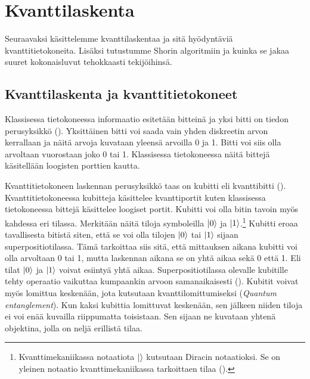 \chapter{Kvanttilaskenta}
Seuraavaksi käsittelemme kvanttilaskentaa ja sitä hyödyntäviä kvanttitietokoneita. Lisäksi tutustumme Shorin algoritmiin ja kuinka se jakaa suuret kokonaisluvut tehokkaasti tekijöihinsä.

\section{Kvanttilaskenta ja kvanttitietokoneet}
Klassisessa tietokoneessa informaatio esitetään bitteinä ja yksi bitti on tiedon perusyksikkö (\cite{doi:10.1080/23742917.2016.1226650}). Yksittäinen bitti voi saada vain yhden diskreetin arvon kerrallaan ja näitä arvoja kuvataan yleensä arvoilla 0 ja 1. Bitti voi siis olla arvoltaan vuorostaan joko 0 tai 1. Klassisessa tietokoneessa näitä bittejä käsitellään loogisten porttien kautta.

Kvanttitietokoneen laskennan perusyksikkö taas on kubitti eli kvanttibitti (\cite{doi:10.1080/23742917.2016.1226650}). Kvanttitietokoneessa kubitteja käsittelee kvanttiportit kuten klassisessa tietokoneessa bittejä käsittelee loogiset portit. Kubitti voi olla bitin tavoin myös kahdessa eri tilassa. Merkitään näitä tiloja symboleilla
$\ket{0}$ ja $\ket{1}$.\footnote{Kvanttimekaniikassa notaatiota $\ket{}$ kutsutaan Diracin notaatioksi. Se on yleinen notaatio kvanttimekaniikassa tarkoittaen tilaa (\cite{nielsen2001quantum}).} Kubitti eroaa tavallisesta bitistä siten, että se voi olla tilojen $\ket{0}$ tai $\ket{1}$ sijaan superpositiotilassa. Tämä tarkoittaa siis sitä, että mittauksen aikana kubitti voi olla arvoltaan 0 tai 1, mutta laskennan aikana se on yhtä aikaa sekä 0 että 1. Eli tilat $\ket{0}$ ja $\ket{1}$ voivat esiintyä yhtä aikaa. Superpositiotilassa olevalle kubitille tehty operaatio vaikuttaa kumpaankin arvoon samanaikaisesti (\cite{mavroeidis2018impact}). Kubitit voivat myös lomittua keskenään, jota kutsutaan kvanttilomittumiseksi (\emph{Quantum entanglement}). Kun kaksi kubittia lomittuvat keskenään, sen jälkeen niiden tiloja ei voi enää kuvailla riippumatta toisistaan. Sen sijaan ne kuvataan yhtenä objektina, jolla on neljä erillistä tilaa.

